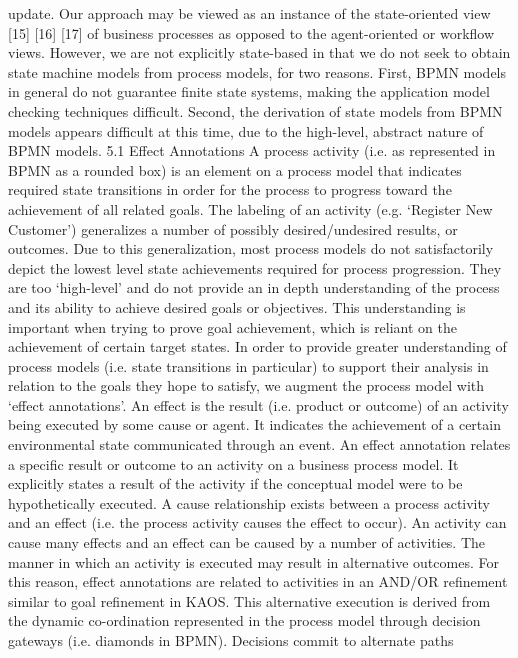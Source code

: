 update.
Our approach may be viewed as an instance of the state-oriented view [15]
[16] [17] of business processes as opposed to the agent-oriented or workflow views.
However, we are not explicitly state-based in that we do not seek to obtain state
machine models from process models, for two reasons. First, BPMN models
in general do not guarantee finite state systems, making the application model
checking techniques difficult. Second, the derivation of state models from BPMN
models appears difficult at this time, due to the high-level, abstract nature of
BPMN models.
5.1 Effect Annotations
A process activity (i.e. as represented in BPMN as a rounded box) is an element
on a process model that indicates required state transitions in order for the
process to progress toward the achievement of all related goals. The labeling
of an activity (e.g. ‘Register New Customer’) generalizes a number of possibly
desired/undesired results, or outcomes. Due to this generalization, most process
models do not satisfactorily depict the lowest level state achievements required
for process progression. They are too ‘high-level’ and do not provide an in depth
understanding of the process and its ability to achieve desired goals or objectives.
This understanding is important when trying to prove goal achievement, which
is reliant on the achievement of certain target states. In order to provide greater
understanding of process models (i.e. state transitions in particular) to support
their analysis in relation to the goals they hope to satisfy, we augment the process
model with ‘effect annotations’.
An effect is the result (i.e. product or outcome) of an activity being executed
by some cause or agent. It indicates the achievement of a certain environmental
state communicated through an event. An effect annotation relates a specific
result or outcome to an activity on a business process model. It explicitly states a
result of the activity if the conceptual model were to be hypothetically executed.
A cause relationship exists between a process activity and an effect (i.e. the
process activity causes the effect to occur). An activity can cause many effects
and an effect can be caused by a number of activities.
The manner in which an activity is executed may result in alternative outcomes. For this reason, effect annotations are related to activities in an AND/OR
refinement similar to goal refinement in KAOS. This alternative execution is derived from the dynamic co-ordination represented in the process model through
decision gateways (i.e. diamonds in BPMN). Decisions commit to alternate paths
